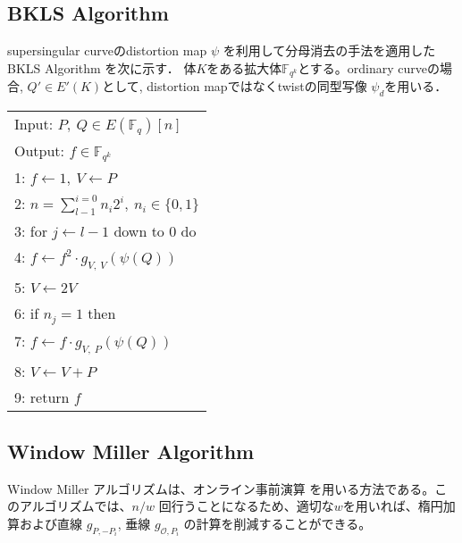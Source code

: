 \documentclass[twocolumn]{jsarticle} %
\begin{document}
\subsection{BKLS Algorithm}
 supersingular curveのdistortion map $\psi$ を利用して分母消去の手法を適用したBKLS Algorithm \cite{BKLS02}を次に示す． 体$K$をある拡大体$\mathbb{F}_{q^k}$とする。ordinary curveの場合, $Q' \in E'(K)$として, distortion mapではなくtwistの同型写像 $\psi _d$を用いる．

\begin{table}[h]
 \begin{center}
  \begin{tabular}{|l|}
     \hline
 Input: $P,\ Q \in E(\mathbb{F}_q)[n]$\\
 Output: $f \in \mathbb{F}_{q^k} $\\
     \hline
 1: \quad $f \gets 1,\ V \gets P$\\
 2: \quad $n=\sum_{l-1}^{i=0} n_i 2^i, \ n_i \in \{0,1\}$\\
 3: \quad for $j \gets l-1$ down to 0 do\\
 4: \quad \quad $f \gets f^2 \cdot g_{V,\ V}(\psi (Q))$\\
 5: \quad \quad $V \gets 2V$\\
 6: \quad if $n_j = 1$ then\\
 7: \quad \quad $f \gets f \cdot g_{V,\ P}(\psi (Q))$\\
 8: \quad \quad $V \gets V+P$\\
 9: \quad return $f$\\
     \hline
   \end{tabular}
 \end{center}
\end{table}
\vspace{-8mm}
\par

\subsection{Window Miller Algorithm}

Window Miller アルゴリズムは、オンライン事前演算 を用いる方法である。このアルゴリズムでは、$n/w$ 回行うことになるため、適切な$w$を用いれば、楕円加算および直線 $g _{P, -P_i}$, 垂線 $g _{\mathcal{O},P_i}$ の計算を削減することができる。
\par
\end{document}
